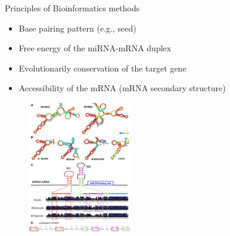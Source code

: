 \documentclass{beamer}
\begin{document}
\begin{frame}{Principles of Bioinformatics methods}
\begin{itemize}
\item Base pairing pattern (e.g., seed)
\item Free energy of the miRNA-mRNA duplex
\item Evolutionarily conservation of the target gene
\item Accessibility of the mRNA (mRNA secondary structure)
\end{itemize}
\begin{figure}[hb!]
	  \centering
    \includegraphics[width=0.4\textwidth]{images/mirna seed second.jpg}
\end{figure}
\end{frame}
\end{document}
